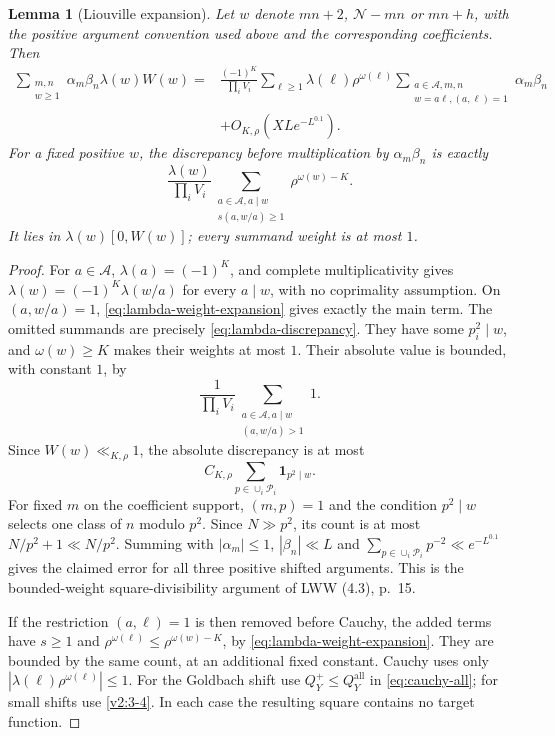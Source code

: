 \documentclass[11pt]{article}
\newtheorem{lemma}[theorem]{Lemma}
\theoremstyle{definition}
\newcommand{\ind}{\mathbf 1}
\newcommand{\GN}{\mathcal N}
\newcommand{\Aset}{\mathcal A}
\newcommand{\QQ}{Q_Y^{\mathrm{all}}}
\theoremstyle{remark}
\numberwithin{equation}{section}
\begin{document}
\begin{lemma}[Liouville expansion]\label{lem:lambda-expansion}
Let $w$ denote $mn+2$, $\GN-mn$ or $mn+h$, with the positive
argument convention used above and the corresponding coefficients.
Then
\begin{equation}\label{eq:lambda-expansion}
 \begin{split}
 \sum_{\substack{m,n\\w\ge1}}\alpha_m\beta_n\lambda(w)W(w)
 ={}&\frac{(-1)^K}{\prod_iV_i}\sum_{\ell\ge1}\lambda(\ell)
                  \rho^{\omega(\ell)}
 \sum_{\substack{a\in\Aset,m,n\\w=a\ell,(a,\ell)=1}}\alpha_m\beta_n\\
 &+O_{K,\rho}(XL e^{-L^{0.1}}).
 \end{split}
\end{equation}
For a fixed positive $w$, the discrepancy before multiplication by
$\alpha_m\beta_n$ is exactly
\begin{equation}\label{eq:lambda-discrepancy}
 \frac{\lambda(w)}{\prod_iV_i}
 \sum_{\substack{a\in\Aset,a\mid w\\s(a,w/a)\ge1}}
                              \rho^{\omega(w)-K}.
\end{equation}
It lies in $\lambda(w)[0,W(w)]$; every summand weight is at most $1$.
\end{lemma}
\begin{proof}
For $a\in\Aset$, $\lambda(a)=(-1)^K$, and complete
multiplicativity gives $\lambda(w)=(-1)^K\lambda(w/a)$ for every
$a\mid w$, with no coprimality assumption.
On $(a,w/a)=1$, \eqref{eq:lambda-weight-expansion} gives exactly
the main term. The omitted summands are precisely
\eqref{eq:lambda-discrepancy}.
They have some $p_i^2\mid w$, and $\omega(w)\ge K$ makes their
weights at most $1$. Their absolute value is bounded, with constant
$1$, by
\[
 \frac1{\prod_iV_i}\sum_{\substack{a\in\Aset,a\mid w\\(a,w/a)>1}}1.
\]
Since $W(w)\ll_{K,\rho}1$, the absolute discrepancy is at most
\[
 C_{K,\rho}\sum_{p\in\cup_i\mathcal P_i}\ind_{p^2\mid w}.
\]
For fixed $m$ on the coefficient support, $(m,p)=1$ and the
condition $p^2\mid w$ selects one class of $n$ modulo $p^2$.
Since $N\gg p^2$, its count is at most $N/p^2+1\ll N/p^2$.
Summing with $|\alpha_m|\le1$, $|\beta_n|\ll L$ and
$\sum_{p\in\cup_i\mathcal P_i}p^{-2}\ll e^{-L^{0.1}}$
gives the claimed error for all three positive shifted arguments.
This is the bounded-weight square-divisibility argument of
LWW (4.3), p.~15.

If the restriction $(a,\ell)=1$ is then removed before Cauchy,
the added terms have $s\ge1$ and
$\rho^{\omega(\ell)}\le\rho^{\omega(w)-K}$, by
\eqref{eq:lambda-weight-expansion}. They are bounded by the same
count, at an additional fixed constant.
Cauchy uses only $|\lambda(\ell)\rho^{\omega(\ell)}|\le1$.
For the Goldbach shift use $Q_Y^+\le\QQ$ in
\eqref{eq:cauchy-all}; for small shifts use \eqref{v2:3-4}.
In each case the resulting square contains no target function.
\end{proof}
\end{document}

